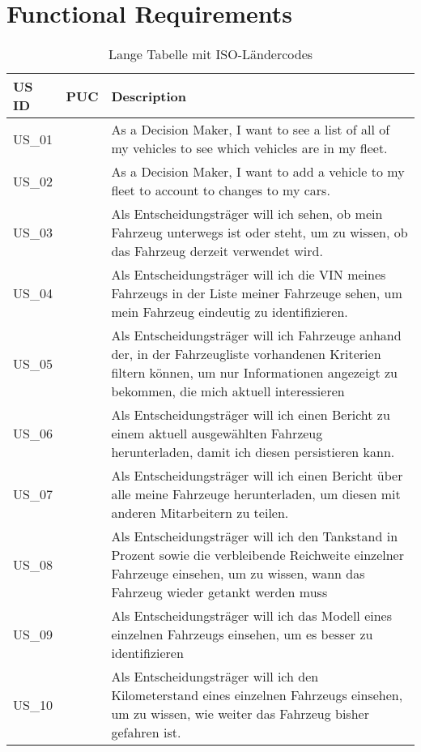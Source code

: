 \chapter{Functional Requirements}

  \sffamily
  \begin{footnotesize}
    \begin{longtable}[i i L]{ p{} p{} p{} }
      \caption[Tabelle mit ISO-Ländercodes]                       %
          {Lange Tabelle mit ISO-Ländercodes\label{laendercodes}} %
          \\
      \toprule
      \textbf{US ID} & \textbf{PUC} & \textbf{Description} \\
      \midrule
      US\_01 & & As a Decision Maker, I want to see a list of all of my vehicles to see which vehicles are in my fleet.\\
      US\_02 & & As a Decision Maker, I want to add a vehicle to my fleet to account to changes to my cars. \\
      US\_03 & & Als Entscheidungsträger will ich sehen, ob mein Fahrzeug unterwegs ist oder steht, um zu wissen, ob das Fahrzeug derzeit verwendet wird. \\
      US\_04 & & Als Entscheidungsträger will ich die VIN meines Fahrzeugs in der Liste meiner Fahrzeuge sehen, um mein Fahrzeug eindeutig zu identifizieren. \\
      US\_05 & & Als Entscheidungsträger will ich Fahrzeuge anhand der, in der Fahrzeugliste vorhandenen Kriterien filtern können, um nur Informationen angezeigt zu bekommen, die mich aktuell interessieren \\
      US\_06 & & Als Entscheidungsträger will ich einen Bericht zu einem aktuell ausgewählten Fahrzeug herunterladen, damit ich diesen persistieren kann. \\
      US\_07 & & Als Entscheidungsträger will ich einen Bericht über alle meine Fahrzeuge herunterladen, um diesen mit anderen Mitarbeitern zu teilen. \\
      US\_08 & & Als Entscheidungsträger will ich den Tankstand in Prozent sowie die verbleibende Reichweite einzelner Fahrzeuge einsehen, um zu wissen, wann das Fahrzeug wieder getankt werden muss \\ 
      US\_09 & & Als Entscheidungsträger will ich das Modell eines einzelnen Fahrzeugs einsehen, um es besser zu identifizieren \\
      US\_10 & & Als Entscheidungsträger will ich den Kilometerstand eines einzelnen Fahrzeugs einsehen, um zu wissen, wie weiter das Fahrzeug bisher gefahren ist. \\

\end{longtable}
\end{footnotesize}
